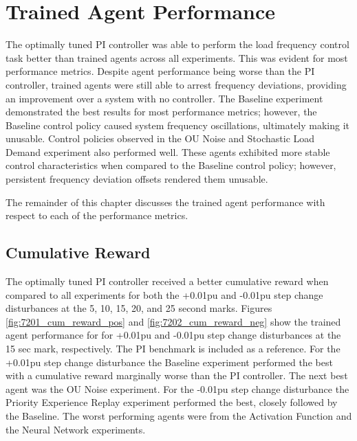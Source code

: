 \section{Trained Agent Performance}
The optimally tuned PI controller was able to perform the load frequency control task better than trained agents across all experiments. This was evident for most performance metrics. Despite agent performance being worse than the PI controller, trained agents were still able to arrest frequency deviations, providing an improvement over a system with no controller. The Baseline experiment demonstrated the best results for most performance metrics; however, the Baseline control policy caused system frequency oscillations, ultimately making it unusable. Control policies observed in the OU Noise and Stochastic Load Demand experiment also performed well. These agents exhibited more stable control characteristics when compared to the Baseline control policy; however, persistent frequency deviation offsets rendered them unusable. 

The remainder of this chapter discusses the trained agent performance with respect to each of the performance metrics.

\subsection{Cumulative Reward}
The optimally tuned PI controller received a better cumulative reward when compared to all experiments for both the +0.01pu and -0.01pu step change disturbances at the 5, 10, 15, 20, and 25 second marks. Figures \ref{fig:7201_cum_reward_pos} and \ref{fig:7202_cum_reward_neg} show the trained agent performance for for +0.01pu and -0.01pu step change disturbances at the 15 sec mark, respectively. The PI benchmark is included as a reference. For the +0.01pu step change disturbance the Baseline experiment performed the best with a cumulative reward marginally worse than the PI controller. The next best agent was the OU Noise experiment. For the -0.01pu step change disturbance the Priority Experience Replay experiment performed the best, closely followed by the Baseline. The worst performing agents were from the Activation Function and the Neural Network experiments.

